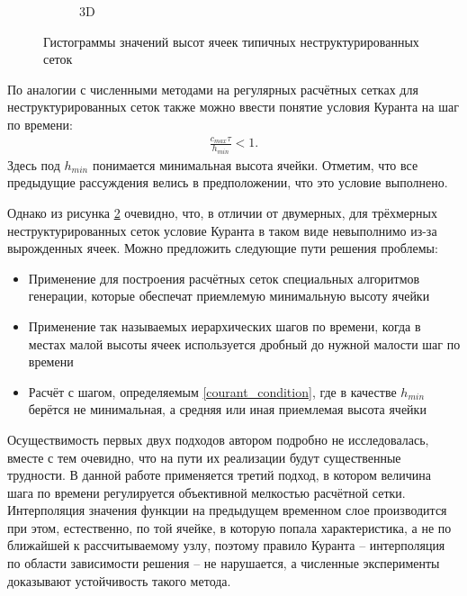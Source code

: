\begin{figure}[H]
\begin{subfigure}{.5\textwidth}
  \caption{3D}
  \label{fig:hist-3d}
\end{subfigure}
\caption{Гистограммы значений высот ячеек типичных неструктурированных сеток}
\label{fig:cell_h_histograms}
\end{figure}

По аналогии с численными методами на регулярных расчётных сетках 
для неструктурированных сеток также можно ввести понятие условия Куранта 
на шаг по времени:
\begin{eqnarray}
\label{courant_condition}
	\frac{c_{max} \tau}{h_{min}} < 1.
\end{eqnarray}
Здесь под $h_{min}$ понимается минимальная высота ячейки. Отметим, что 
все предыдущие рассуждения велись в предположении, что это условие выполнено.

Однако из рисунка \ref{fig:cell_h_histograms} очевидно, что, в отличии от двумерных, 
для трёхмерных неструктурированных сеток условие Куранта в таком виде невыполнимо 
из-за вырожденных ячеек. Можно предложить следующие пути решения проблемы:
\begin{itemize}
\item Применение для построения расчётных сеток специальных алгоритмов генерации, 
которые обеспечат приемлемую минимальную высоту ячейки
\item Применение так называемых иерархических шагов по времени, когда в местах 
малой высоты ячеек используется дробный до нужной малости шаг по времени
\item Расчёт с шагом, определяемым \ref{courant_condition}, где в качестве $h_{min}$ 
берётся не минимальная, а средняя или иная приемлемая высота ячейки
\end{itemize}

Осуществимость первых двух подходов автором подробно не исследовалась, 
вместе с тем очевидно, что на пути их реализации будут существенные трудности. 
В данной работе применяется третий подход, в котором величина шага по времени 
регулируется объективной мелкостью расчётной сетки. Интерполяция значения функции 
на предыдущем временном слое производится при этом, естественно, по той ячейке, 
в которую попала характеристика, а не по ближайшей к рассчитываемому узлу, поэтому 
правило Куранта -- интерполяция по области зависимости решения -- 
не нарушается, а численные эксперименты доказывают устойчивость такого метода.


